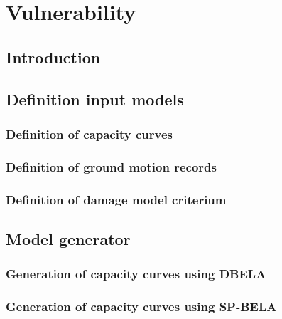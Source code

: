 \chapter{Vulnerability}
\label{chap:vulnerability}

    \section{Introduction}
    

    \section{Definition input models}
    
    
		\subsection{Definition of capacity curves}
		\label{subsec:cap_curves}
		
		
		\subsection{Definition of ground motion records}
		\label{subsec:gmrs}
		
		
		\subsection{Definition of damage model criterium}
		\label{subsec:dmg_model}
		

	\section{Model generator}
	\label{sec:model-gen}
	
		
		\subsection{Generation of capacity curves using DBELA}
		\label{subsec:DBELA}
		
		
		\subsection{Generation of capacity curves using SP-BELA}
		\label{subsec:SPBELA}
		
		
